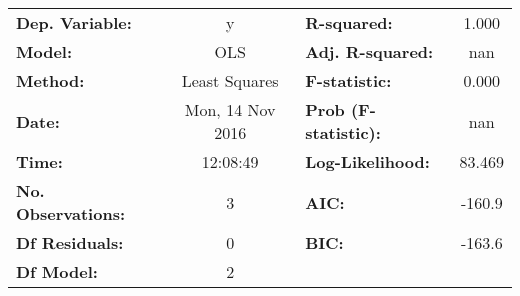 \begin{table}[!htbp]
    \begin{center}
    \begin{tabular}{lclc}
        \toprule
        \textbf{Dep. Variable:}    &        y         & \textbf{  R-squared:         } &     1.000   \\
        \textbf{Model:}            &       OLS        & \textbf{  Adj. R-squared:    } &       nan   \\
        \textbf{Method:}           &  Least Squares   & \textbf{  F-statistic:       } &     0.000   \\
        \textbf{Date:}             & Mon, 14 Nov 2016 & \textbf{  Prob (F-statistic):} &      nan    \\
        \textbf{Time:}             &     12:08:49     & \textbf{  Log-Likelihood:    } &    83.469   \\
        \textbf{No. Observations:} &           3      & \textbf{  AIC:               } &    -160.9   \\
        \textbf{Df Residuals:}     &           0      & \textbf{  BIC:               } &    -163.6   \\
        \textbf{Df Model:}         &           2      & \textbf{                     } &             \\
        \bottomrule
    \end{tabular}
    
    
    

\end{center}
\end{table}
